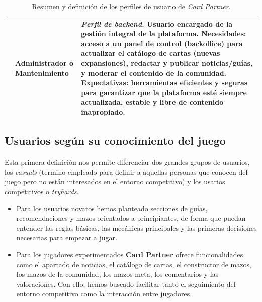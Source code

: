 \documentclass[10pt]{article}
\begin{document}
\begin{table}[H]
\begin{tabularx}{\textwidth}{|>{\raggedright\arraybackslash}p{3cm}|>{\raggedright\arraybackslash}p{4cm}|>{\raggedright\arraybackslash}X|}
			\cline{2-3}
			& \textbf{Administrador o Mantenimiento} & \textit{Perfil de backend}. Usuario encargado de la gestión integral de la plataforma. \textbf{Necesidades:} acceso a un panel de control (backoffice) para actualizar el catálogo de cartas (nuevas expansiones), redactar y publicar noticias/guías, y moderar el contenido de la comunidad. \textbf{Expectativas:} herramientas eficientes y seguras para garantizar que la plataforma esté siempre actualizada, estable y libre de contenido inapropiado. \\
			\hline
		\end{tabularx}
		\caption{Resumen y definición de los perfiles de usuario de \textit{Card Partner}.}
		\label{tab:perfiles_usuario}
	\end{table}
	
	\subsection{Usuarios según su conocimiento del juego}
	Esta primera definición nos permite diferenciar dos grandes grupos de usuarios, los \textit{casuals} (termino empleado para definir a aquellas personas que conocen del juego pero no están interesados en el entorno competitivo) y los usarios competitivos o \textit{tryhards}. \\ 
	\begin{itemize}
		\item Para los  usuarios novatos hemos planteado secciones de guías, recomendaciones y mazos orientados a principiantes, de forma que puedan entender las reglas básicas, las mecánicas principales y las primeras decisiones necesarias para empezar a jugar.
		\item Para los  jugadores experimentados \textbf{Card Partner} ofrece funcionalidades como el apartado de noticias, el catálogo de cartas, el constructor de mazos, los mazos de la comunidad, los mazos meta, los comentarios y las valoraciones. Con ello, hemos buscado facilitar tanto el seguimiento del entorno competitivo como la interacción entre jugadores.
	\end{itemize}
	
\end{document}
